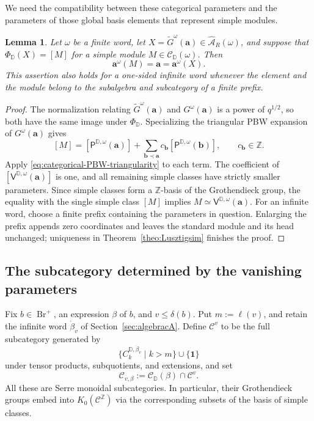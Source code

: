 \documentclass[12pt, reqno]{amsart}
\theoremstyle{plain}
\newtheorem{lemma}[theorem]{Lemma}
\theoremstyle{definition}
\numberwithin{equation}{section}
\newcommand{\ZZ}{\mathbb{Z}}
\newcommand{\DD}{\mathbb{D}}
\newcommand{\bfa}{\mathbf{a}}
\newcommand{\cA}{\mathcal{A}}
\newcommand{\Br}{{\operatorname{Br}}}
\begin{document}
We need the compatibility between these categorical parameters and the
parameters of those global basis elements that represent simple modules.

\begin{lemma}\label{lem:categorical-PBW-compatibility}
Let \(\omega\) be a finite word, let
\(X=\widetilde G^\omega(\mathbf a)\in\widehat{\cA}_R(\omega)\), and
suppose that \(\Phi_{\DD}(X)=[M]\) for a simple module
\(M\in\mathscr C_{\DD}(\omega)\). Then
\[
\bfa^\omega(M)=\mathbf a=\bfa^\omega(X).
\]
This assertion also holds for a one-sided infinite word whenever the
element and the module belong to the subalgebra and subcategory of a
finite prefix.
\end{lemma}

\begin{proof}
The normalization relating \(\widetilde G^\omega(\mathbf a)\) and
\(G^\omega(\mathbf a)\) is a power of \(q^{1/2}\), so both have the
same image under \(\Phi_{\DD}\). Specializing the triangular
PBW expansion of \(G^\omega(\mathbf a)\) gives
\[
[M]=[\mathsf P^{\DD,\omega}(\mathbf a)]
+\sum_{\mathbf b\prec\mathbf a}c_{\mathbf b}
[\mathsf P^{\DD,\omega}(\mathbf b)],
\qquad c_{\mathbf b}\in\ZZ.
\]
Apply \eqref{eq:categorical-PBW-triangularity} to each term. The
coefficient of \([\mathsf V^{\DD,\omega}(\mathbf a)]\) is one, and
all remaining simple classes have strictly smaller parameters.
Since simple classes form a \(\ZZ\)-basis of the Grothendieck group,
the equality with the single simple class \([M]\) implies
\(M\simeq\mathsf V^{\DD,\omega}(\mathbf a)\).
For an infinite word, choose a finite prefix containing the parameters
in question. Enlarging the prefix appends zero coordinates and leaves
the standard module and its head unchanged; uniqueness in
Theorem~\ref{theo:Lusztigsim} finishes the proof.
\end{proof}

\subsection{The subcategory determined by the vanishing parameters}

Fix \(b\in\Br^+\), an expression \(\beta\) of \(b\), and
\(v\le\delta(b)\). Put \(m:=\ell(v)\), and retain the infinite word
\(\dot\beta_v\) of Section~\ref{sec:algebracA}. Define
\(\mathscr C^v\) to be the full subcategory generated by
\[
\{C_k^{\DD,\dot\beta_v}\mid k>m\}\cup\{\mathbf1\}
\]
under tensor products, subquotients, and extensions, and set
\[
\mathscr C_{v,\beta}:=\mathscr C_{\DD}(\beta)\cap\mathscr C^v.
\]
All these are Serre monoidal subcategories. In particular, their
Grothendieck groups embed into \(K_0(\mathscr C^{\ZZ})\) via the
corresponding subsets of the basis of simple classes.
\end{document}
